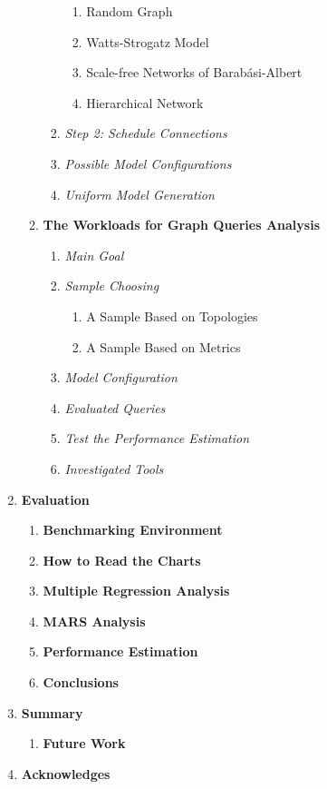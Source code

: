 \begin{enumerate}
\begin{enumerate}[label*=\arabic*.]
\begin{enumerate}[label*=\arabic*.]
\begin{enumerate}[label*=\arabic*.]
				\item Random Graph
				\item Watts-Strogatz Model
				\item Scale-free Networks of Barabási-Albert
				\item Hierarchical Network
			\end{enumerate}
			\item \textit{Step 2: Schedule Connections}
			\item \textit{Possible Model Configurations}
			\item \textit{Uniform Model Generation}
		\end{enumerate}
		\item \textbf{The Workloads for Graph Queries Analysis}
		\begin{enumerate}[label*=\arabic*.]
			\item \textit{Main Goal}
			\item \textit{Sample Choosing}
			\begin{enumerate}[label*=\arabic*.]
				\item A Sample Based on Topologies
				\item A Sample Based on Metrics
			\end{enumerate}
			
			\item \textit{Model Configuration}
			\item \textit{Evaluated Queries}
			\item \textit{Test the Performance Estimation}
			\item \textit{Investigated Tools}
		\end{enumerate}
	\end{enumerate}
	
	
	\item \textbf{Evaluation}
	\begin{enumerate}[label*=\arabic*.]
		\item \textbf{Benchmarking Environment}
		\item \textbf{How to Read the Charts}
		\item \textbf{Multiple Regression Analysis}
		\item \textbf{MARS Analysis}
		\item \textbf{Performance Estimation}
		\item \textbf{Conclusions}
	\end{enumerate}
	\item \textbf{Summary}
	\begin{enumerate}[label*=\arabic*.]
		\item \textbf{Future Work}
	\end{enumerate}
	\item \textbf{Acknowledges}
\end{enumerate}






